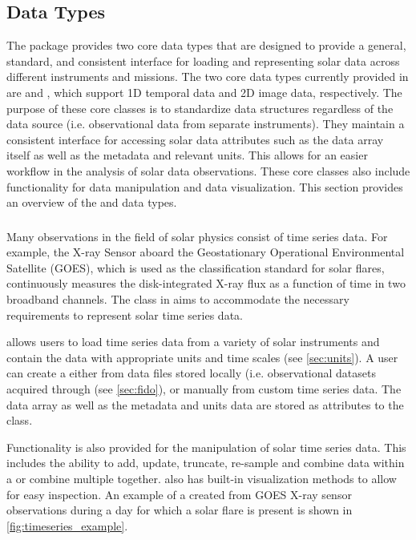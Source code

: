 \subsection{Data Types}
\label{sec:data_types}

The \sunpypkg package provides two core data types that are designed to provide a general, standard, and consistent interface for loading and representing solar data across different instruments and missions.
The two core data types currently provided in \sunpypkg are \Timeseries and \Map, which support 1D temporal data and 2D image data, respectively.
The purpose of these core classes is to standardize data structures regardless of the data source (i.e. observational data from separate instruments).
They maintain a consistent interface for accessing solar data attributes such as the data array itself as well as the metadata and relevant units.
This allows for an easier workflow in the analysis of solar data observations.
These core classes also include functionality for data manipulation and data visualization.
This section provides an overview of the \Timeseries and \Map data types.

\subsubsection{\Timeseries}
\label{sec:timeseries}
Many observations in the field of solar physics consist of time series data.
For example, the X-ray Sensor aboard the Geostationary Operational Environmental Satellite (GOES), which is used as the classification standard for solar flares, continuously measures the disk-integrated X-ray flux as a function of time in two broadband channels.
The \Timeseries class in \sunpypkg aims to accommodate the necessary requirements to represent solar time series data.

\Timeseries allows users to load time series data from a variety of solar instruments and contain the data with appropriate units and time scales (see \autoref{sec:units}).
 A user can create a \Timeseries either from data files stored locally (i.e. observational datasets acquired through \Fido (see \autoref{sec:fido}), or manually from custom time series data.
 The data array as well as the metadata and units data are stored as attributes to the \Timeseries class.

Functionality is also provided for the manipulation of solar time series data.
This includes the ability to add, update, truncate, re-sample and combine data within a \Timeseries or combine multiple \Timeseries together.
\Timeseries also has built-in visualization methods to allow for easy inspection.
An example of a \Timeseries created from GOES X-ray sensor observations during a day for which a solar flare is present is shown in \autoref{fig:timeseries_example}.

